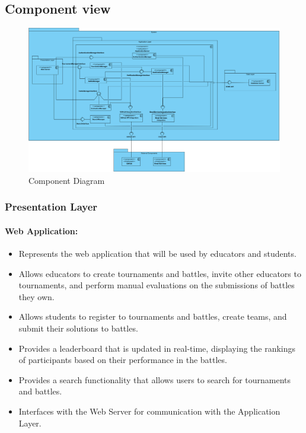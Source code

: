 \documentclass{article}
\begin{document}
\newpage

\subsection{Component view}

\begin{figure}[H]
    \centering
    \includegraphics[width=1\textwidth]{images/ComponentDiagram.png}
    \caption{Component Diagram}
    \label{fig:ComponentDiagram}
\end{figure}

\subsubsection{Presentation Layer}

\paragraph{Web Application:}

\begin{itemize}
    \item Represents the web application that will be used by educators and students.
    \item Allows educators to create tournaments and battles, invite other educators to tournaments, and perform manual evaluations on the submissions of battles they own.
    \item Allows students to register to tournaments and battles, create teams, and submit their solutions to battles.
    \item Provides a leaderboard that is updated in real-time, displaying the rankings of participants based on their performance in the battles.
    \item Provides a search functionality that allows users to search for tournaments and battles.
    \item Interfaces with the Web Server for communication with the Application Layer.
\end{itemize}
\end{document}
